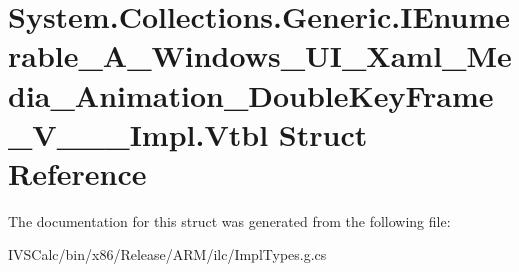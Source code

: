 \hypertarget{struct_system_1_1_collections_1_1_generic_1_1_i_enumerable___a___windows___u_i___xaml___media___fb4cba0831341e9a4d57fb8a2fc3dbfc}{}\section{System.\+Collections.\+Generic.\+I\+Enumerable\+\_\+\+A\+\_\+\+Windows\+\_\+\+U\+I\+\_\+\+Xaml\+\_\+\+Media\+\_\+\+Animation\+\_\+\+Double\+Key\+Frame\+\_\+\+V\+\_\+\+\_\+\+\_\+\+Impl.\+Vtbl Struct Reference}
\label{struct_system_1_1_collections_1_1_generic_1_1_i_enumerable___a___windows___u_i___xaml___media___fb4cba0831341e9a4d57fb8a2fc3dbfc}


The documentation for this struct was generated from the following file\+:\begin{DoxyCompactItemize}
\item 
I\+V\+S\+Calc/bin/x86/\+Release/\+A\+R\+M/ilc/Impl\+Types.\+g.\+cs\end{DoxyCompactItemize}
